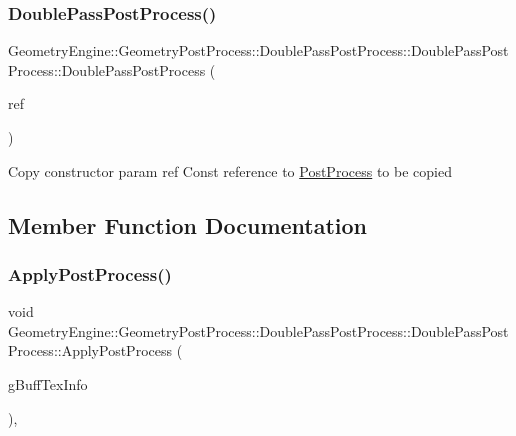 \subsubsection{\texorpdfstring{DoublePassPostProcess()}{DoublePassPostProcess()}\hspace{0.1cm}{\footnotesize\ttfamily [2/2]}}
{\footnotesize\ttfamily Geometry\+Engine\+::\+Geometry\+Post\+Process\+::\+Double\+Pass\+Post\+Process\+::\+Double\+Pass\+Post\+Process\+::\+Double\+Pass\+Post\+Process (\begin{DoxyParamCaption}\item[{const \mbox{\hyperlink{class_geometry_engine_1_1_geometry_post_process_1_1_double_pass_post_process_1_1_double_pass_post_process}{Double\+Pass\+Post\+Process}} \&}]{ref }\end{DoxyParamCaption})\hspace{0.3cm}{\ttfamily [inline]}}

Copy constructor param ref Const reference to \mbox{\hyperlink{class_geometry_engine_1_1_geometry_post_process_1_1_post_process}{Post\+Process}} to be copied 

\subsection{Member Function Documentation}
\mbox{\label{class_geometry_engine_1_1_geometry_post_process_1_1_double_pass_post_process_1_1_double_pass_post_process_a9d2674bc5b237ed2e494d1c88f63d29e}} 
\subsubsection{\texorpdfstring{ApplyPostProcess()}{ApplyPostProcess()}}
{\footnotesize\ttfamily void Geometry\+Engine\+::\+Geometry\+Post\+Process\+::\+Double\+Pass\+Post\+Process\+::\+Double\+Pass\+Post\+Process\+::\+Apply\+Post\+Process (\begin{DoxyParamCaption}\item[{const \mbox{\hyperlink{struct_geometry_engine_1_1_g_buffer_texture_info}{G\+Buffer\+Texture\+Info}} \&}]{g\+Buff\+Tex\+Info }\end{DoxyParamCaption})\hspace{0.3cm}{\ttfamily [override]}, {\ttfamily [virtual]}}

